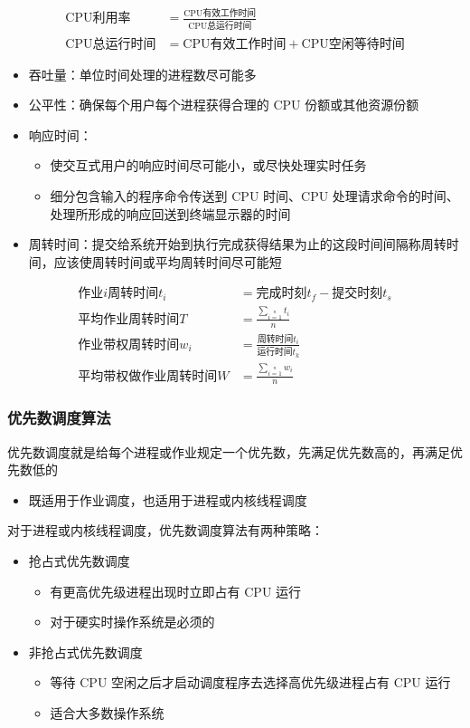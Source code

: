 \documentclass[cs4size,a4paper,10pt]{ctexart}
\begin{document}
	\begin{align*}
		\mathrm{CPU}\mbox{利用率} & =\frac{\mathrm{CPU}\mbox{有效工作时间}}{\mathrm{CPU}\mbox{总运行时间}}  \\
		\mathrm{CPU}\mbox{总运行时间} & = \mathrm{CPU}\mbox{有效工作时间} + \mathrm{CPU}\mbox{空闲等待时间}
	\end{align*}

	\begin{itemize}
		\item 吞吐量：单位时间处理的进程数尽可能多
		\item 公平性：确保每个用户每个进程获得合理的 CPU 份额或其他资源份额
		\item 响应时间：
		\begin{itemize}
			\item 使交互式用户的响应时间尽可能小，或尽快处理实时任务
			\item 细分包含输入的程序命令传送到 CPU 时间、CPU 处理请求命令的时间、处理所形成的响应回送到终端显示器的时间
		\end{itemize}
		\item 周转时间：提交给系统开始到执行完成获得结果为止的这段时间间隔称周转时间，应该使周转时间或平均周转时间尽可能短
	\end{itemize}
	\begin{align*}
		\mbox{作业}i\mbox{周转时间}t_i & = \mbox{完成时刻}t_f - \mbox{提交时刻} t_s \\
		\mbox{平均作业周转时间}T & = \frac{\sum \limits_{i=1}\limits^nt_i}{n}\\
		\mbox{作业带权周转时间}w_i & = \frac{\mbox{周转时间}t_i}{\mbox{运行时间}t_k} \\
		\mbox{平均带权做作业周转时间}W & =  \frac{\sum\limits_{i=1}\limits^nw_i}{n}
	\end{align*}

	\subsubsection{优先数调度算法}
	优先数调度就是给每个进程或作业规定一个优先数，先满足优先数高的，再满足优先数低的
	\begin{itemize}
		\item 既适用于作业调度，也适用于进程或内核线程调度
	\end{itemize}

	对于进程或内核线程调度，优先数调度算法有两种策略：
	\begin{itemize}
		\item 抢占式优先数调度
		\begin{itemize}
			\item 有更高优先级进程出现时立即占有 CPU 运行
			\item 对于硬实时操作系统是必须的
		\end{itemize}
		\item 非抢占式优先数调度
		\begin{itemize}
			\item 等待 CPU 空闲之后才启动调度程序去选择高优先级进程占有 CPU 运行
			\item 适合大多数操作系统
		\end{itemize}
	\end{itemize}
\end{document}
